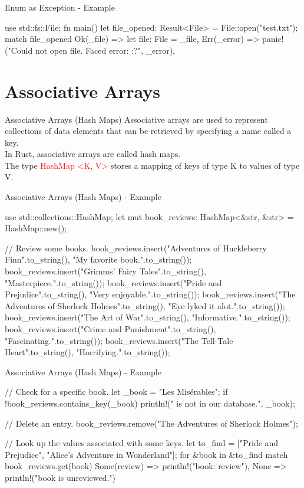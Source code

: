 \documentclass[10pt,xcolor={dvipsnames}, aspectratio=169]{beamer}
\begin{document}
	\begin{frame}[fragile]{Enum as Exception - Example}
	        \begin{rustcode}
use std::fs::File;
fn main() {
    let file_opened: Result<File> = File::open("test.txt");
    match file_opened {
        Ok(_file) => let file: File = _file,
        Err(_error) => panic!("Could not open file. Faced error: {:?}", _error),
    }
}
        \end{rustcode}
    \end{frame}

\section{Associative Arrays}
\begin{frame}[fragile]{Associative Arrays (Hash Maps)}
	    Associative arrays are used to represent collections of data elements that can be retrieved by specifying a name called a key. \\
	    In Rust, associative arrays are called hash maps. \\
        The type \textcolor{red}{HashMap <K, V>} stores a mapping of keys of type K to values of type V.
\end{frame}
	\begin{frame}[fragile]{Associative Arrays (Hash Maps) - Example}
	        \begin{rustcode}
use std::collections::HashMap;
let mut book_reviews: HashMap<&str, &str> = HashMap::new();

// Review some books.
book_reviews.insert("Adventures of Huckleberry Finn".to_string(), "My favorite book.".to_string());
book_reviews.insert("Grimms' Fairy Tales".to_string(), "Masterpiece.".to_string());
book_reviews.insert("Pride and Prejudice".to_string(), "Very enjoyable.".to_string());
book_reviews.insert("The Adventures of Sherlock Holmes".to_string(), "Eye lyked it alot.".to_string());
book_reviews.insert("The Art of War".to_string(), "Informative.".to_string());
book_reviews.insert("Crime and Punishment".to_string(), "Fascinating.".to_string());
book_reviews.insert("The Tell-Tale Heart".to_string(), "Horrifying.".to_string());
        \end{rustcode}
    \end{frame}

\begin{frame}[fragile]{Associative Arrays (Hash Maps) - Example}
	       \begin{rustcode}
// Check for a specific book.
let _book = "Les Misérables";
if !book_reviews.contains_key(_book) {
    println!("{} is not in our database.", _book);
}

// Delete an entry.
book_reviews.remove("The Adventures of Sherlock Holmes");

// Look up the values associated with some keys.
let to_find = ["Pride and Prejudice", "Alice's Adventure in Wonderland"];
for &book in &to_find {
    match book_reviews.get(book) {
        Some(review) => println!("{book}: {review}"),
        None => println!("{book} is unreviewed.")
    }
}
\end{rustcode}
    \end{frame}
\end{document}
